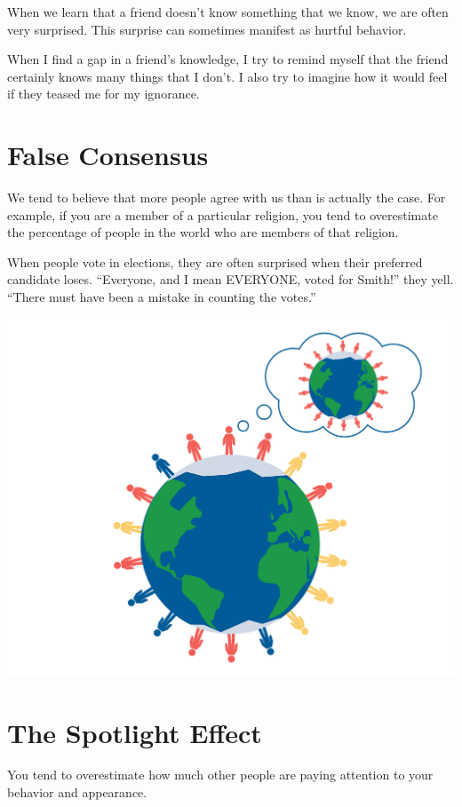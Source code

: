 When we learn that a friend doesn't know something that we know,
we are often very surprised. This surprise can sometimes manifest as
hurtful behavior.

When I find a gap in a friend's knowledge, I try to remind myself that
the friend certainly knows many things that I don't. I also try to
imagine how it would feel if they teased me for my ignorance.

\section{False Consensus}

We tend to believe that more people agree with us than is actually
the case. For example, if you are a member of a particular religion,
you tend to overestimate the percentage of people in the world who are
members of that religion.

When people vote in elections, they are often surprised when their
preferred candidate loses. ``Everyone, and I mean EVERYONE, voted for
Smith!'' they yell.  ``There must have been a mistake in counting the
votes.''

\includegraphics[width=1\textwidth]{falseConsensus.png}

\section{The Spotlight Effect}

You tend to overestimate how much other people are paying attention to
your behavior and appearance.

